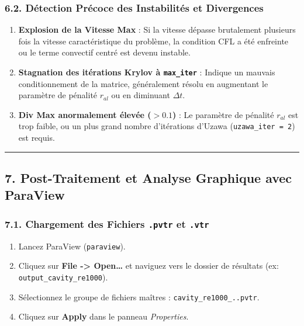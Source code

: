 \documentclass[
  french,
]{article}
\providecommand{\tightlist}{%
  \setlength{\itemsep}{0pt}\setlength{\parskip}{0pt}}
\begin{document}
\subsubsection{6.2. Détection Précoce des Instabilités et
Divergences}\label{duxe9tection-pruxe9coce-des-instabilituxe9s-et-divergences}

\begin{enumerate}
\def\labelenumi{\arabic{enumi}.}
\tightlist
\item
  \textbf{Explosion de la Vitesse Max} : Si la vitesse dépasse
  brutalement plusieurs fois la vitesse caractéristique du problème, la
  condition CFL a été enfreinte ou le terme convectif centré est devenu
  instable.
\item
  \textbf{Stagnation des itérations Krylov à \texttt{max\_iter}} :
  Indique un mauvais conditionnement de la matrice, généralement résolu
  en augmentant le paramètre de pénalité \(r_{al}\) ou en diminuant
  \(\Delta t\).
\item
  \textbf{Div Max anormalement élevée (\(> 0.1\))} : Le paramètre de
  pénalité \(r_{al}\) est trop faible, ou un plus grand nombre
  d'itérations d'Uzawa (\texttt{uzawa\_iter\ =\ 2}) est requis.
\end{enumerate}

\begin{center}\rule{0.5\linewidth}{0.5pt}\end{center}

\subsection{7. Post-Traitement et Analyse Graphique avec
ParaView}\label{post-traitement-et-analyse-graphique-avec-paraview}

\subsubsection{\texorpdfstring{7.1. Chargement des Fichiers
\texttt{.pvtr} et
\texttt{.vtr}}{7.1. Chargement des Fichiers .pvtr et .vtr}}\label{chargement-des-fichiers-.pvtr-et-.vtr}

\begin{enumerate}
\def\labelenumi{\arabic{enumi}.}
\tightlist
\item
  Lancez ParaView (\texttt{paraview}).
\item
  Cliquez sur \textbf{File -\textgreater{} Open\ldots{}} et naviguez
  vers le dossier de résultats (ex: \texttt{output\_cavity\_re1000}).
\item
  Sélectionnez le groupe de fichiers maîtres :
  \texttt{cavity\_re1000\_..pvtr}.
\item
  Cliquez sur \textbf{Apply} dans le panneau \emph{Properties}.
\end{enumerate}
\end{document}
